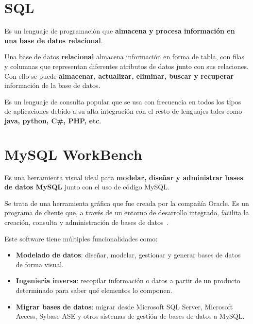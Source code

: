 \documentclass[a4paper, 12pt]{book}
\begin{document}
\section{SQL} 
\label{sec:sql}
Es un lenguaje de programación que \textbf{almacena y procesa información en una base de datos relacional}. 

Una base de datos \textbf{relacional} almacena información en forma de tabla, con filas y columnas que representan diferentes atributos de datos junto con sus relaciones. Con ello se puede \textbf{almacenar, actualizar, eliminar, buscar y recuperar} información de la base de datos.

Es un lenguaje de consulta popular que se usa con frecuencia en todos los tipos de aplicaciones debido a su alta integración con el resto de lenguajes tales como \textbf{java, python, C\#, PHP, etc}.

\section{MySQL WorkBench} 
\label{sec:mysqlworkbench}

Es una herramienta visual ideal para \textbf{modelar, diseñar y administrar bases de datos MySQL} junto con el uso de código MySQL.

Se trata de una herramienta gráfica que fue creada por la compañía Oracle.
Es un programa de cliente que, a través de un entorno de desarrollo integrado, facilita la creación, consulta y administración de bases de datos~\cite{mysql:_workbench}. 

Este software tiene múltiples funcionalidades como:
\begin{itemize}
	\item \textbf {Modelado de datos}: diseñar, modelar, gestionar y generar bases de datos de forma visual. 
	\item \textbf {Ingeniería inversa}: recopilar información o datos a partir de un producto determinado para saber qué elementos lo componen. 
	\item \textbf {Migrar bases de datos}: migrar desde Microsoft SQL Server, Microsoft Access, Sybase ASE y otros sistemas de gestión de bases de datos a MySQL.
\end{itemize}
\end{document}
